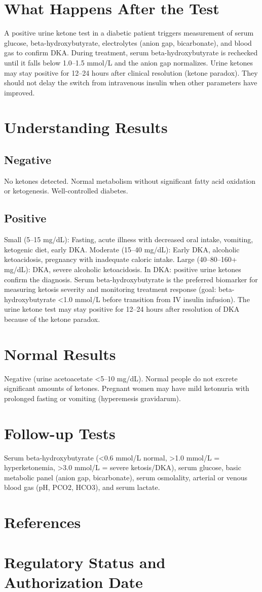 \section*{What Happens After the Test}
A positive urine ketone test in a diabetic patient triggers measurement of serum glucose, beta-hydroxybutyrate, electrolytes (anion gap, bicarbonate), and blood gas to confirm DKA. During treatment, serum beta-hydroxybutyrate is rechecked until it falls below 1.0--1.5 mmol/L and the anion gap normalizes. Urine ketones may stay positive for 12--24 hours after clinical resolution (ketone paradox). They should not delay the switch from intravenous insulin when other parameters have improved.
\section*{Understanding Results}
\subsection*{Negative}
No ketones detected. Normal metabolism without significant fatty acid oxidation or ketogenesis. Well-controlled diabetes.
\subsection*{Positive}
Small (5--15 mg/dL): Fasting, acute illness with decreased oral intake, vomiting, ketogenic diet, early DKA. Moderate (15--40 mg/dL): Early DKA, alcoholic ketoacidosis, pregnancy with inadequate caloric intake. Large (40--80--160+ mg/dL): DKA, severe alcoholic ketoacidosis. In DKA: positive urine ketones confirm the diagnosis. Serum beta-hydroxybutyrate is the preferred biomarker for measuring ketosis severity and monitoring treatment response (goal: beta-hydroxybutyrate <1.0 mmol/L before transition from IV insulin infusion). The urine ketone test may stay positive for 12--24 hours after resolution of DKA because of the ketone paradox.
\section*{Normal Results}
Negative (urine acetoacetate <5--10 mg/dL). Normal people do not excrete significant amounts of ketones. Pregnant women may have mild ketonuria with prolonged fasting or vomiting (hyperemesis gravidarum).
\section*{Follow-up Tests}
Serum beta-hydroxybutyrate (<0.6 mmol/L normal, >1.0 mmol/L = hyperketonemia, >3.0 mmol/L = severe ketosis/DKA), serum glucose, basic metabolic panel (anion gap, bicarbonate), serum osmolality, arterial or venous blood gas (pH, PCO2, HCO3), and serum lactate.
\section*{References}


\clearpage
\section*{Regulatory Status and Authorization Date}

\clearpage
